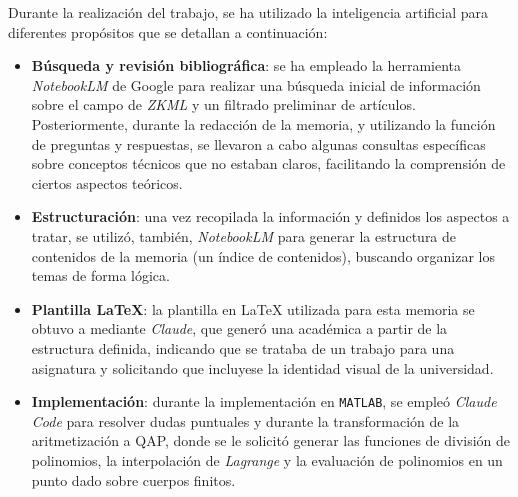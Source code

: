 \documentclass[a4paper, 11pt]{article}
\begin{document}
Durante la realización del trabajo, se ha utilizado la inteligencia artificial para diferentes
propósitos que se detallan a continuación:
\begin{itemize}
  \item \textbf{Búsqueda y revisión bibliográfica}: se ha empleado la herramienta \textit{NotebookLM}
        de Google para realizar una búsqueda inicial de información sobre el campo de \textit{ZKML}
        y un filtrado preliminar de artículos. Posteriormente, durante la redacción de la memoria, y
        utilizando la función de preguntas y respuestas, se llevaron a cabo algunas consultas
        específicas sobre conceptos técnicos que no estaban claros, facilitando la comprensión de
        ciertos aspectos teóricos.
  \item \textbf{Estructuración}: una vez recopilada la información y definidos los aspectos a tratar,
        se utilizó, también, \textit{NotebookLM} para generar la estructura de contenidos de la
        memoria (un índice de contenidos), buscando organizar los temas de forma lógica.
  \item \textbf{Plantilla LaTeX}: la plantilla en LaTeX utilizada para esta memoria se obtuvo a
        mediante \textit{Claude}, que generó una académica a partir de la estructura definida,
        indicando que se trataba de un trabajo para una asignatura y solicitando que incluyese la
        identidad visual de la universidad.
  \item \textbf{Implementación}: durante la implementación en \texttt{MATLAB}, se empleó
        \textit{Claude Code} para resolver dudas puntuales y durante la transformación de la
        aritmetización a QAP, donde se le solicitó generar las funciones de división de polinomios,
        la interpolación de \textit{Lagrange} y la evaluación de polinomios en un punto dado sobre
        cuerpos finitos.
\end{itemize}

\pagebreak



\end{document}
